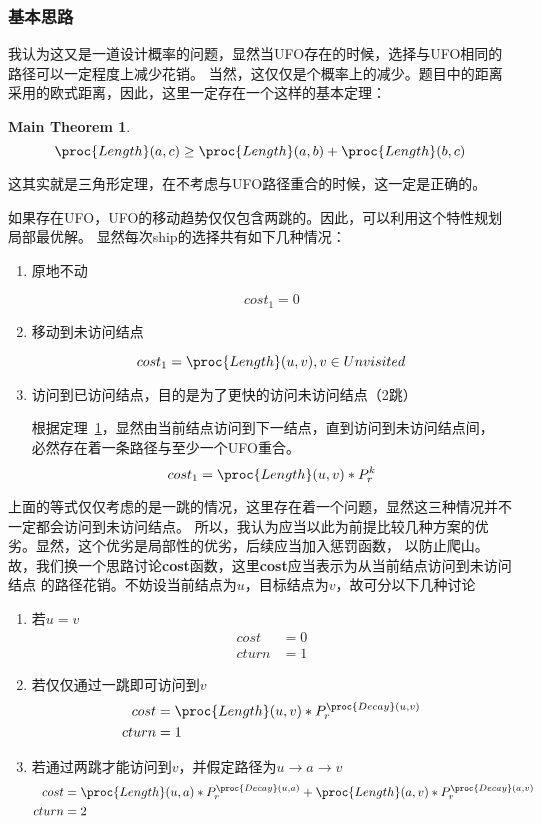 \documentclass[hyperref,UTF8]{ctexart}
\newtheorem{mthm}[thm]{Main Theorem}
\theoremstyle{definition}
\theoremstyle{remark}
\numberwithin{equation}{subsection}
\newcommand{\Emph}{\textbf}
\begin{document}
\subsubsection{基本思路}

	我认为这又是一道设计概率的问题，显然当UFO存在的时候，选择与UFO相同的路径可以一定程度上减少花销。
	当然，这仅仅是个概率上的减少。题目中的距离采用的欧式距离，因此，这里一定存在一个这样的基本定理：
	\begin{mthm}
	\label{mthm:triangle}
		\[
            \proc{Length}(a, c) \ge \proc{Length}(a, b) + \proc{Length}(b, c)
        \]
	\end{mthm}
	这其实就是三角形定理，在不考虑与UFO路径重合的时候，这一定是正确的。
	
	如果存在UFO，UFO的移动趋势仅仅包含两跳的。因此，可以利用这个特性规划局部最优解。
	显然每次ship的选择共有如下几种情况：
	\begin{enumerate}[(1)]
		
		\item 原地不动
		
		\[
			cost_1 = 0
		\]
		
		\item 移动到未访问结点
		
		\[
			cost_1 = \proc{Length}(u, v), v \in Unvisited
		\]
		
		\item 访问到已访问结点，目的是为了更快的访问未访问结点（2跳）
		
		根据定理~\ref{mthm:triangle}，显然由当前结点访问到下一结点，直到访问到未访问结点间，
		必然存在着一条路径与至少一个UFO重合。
		\[
			cost_1 = \proc{Length}(u, v) * P_r^k
		\]
	
	\end{enumerate}
	上面的等式仅仅考虑的是一跳的情况，这里存在着一个问题，显然这三种情况并不一定都会访问到未访问结点。
	所以，我认为应当以此为前提比较几种方案的优劣。显然，这个优劣是局部性的优劣，后续应当加入惩罚函数，
	以防止爬山。故，我们换一个思路讨论\Emph{cost}函数，这里\Emph{cost}应当表示为从当前结点访问到未访问结点
	的路径花销。不妨设当前结点为$u$，目标结点为$v$，故可分以下几种讨论
	\begin{enumerate}[(1)]
	
		\item 若$u = v$
		\begin{align*}
			cost	&=	0	\\
			cturn	&=	1
		\end{align*}
		
		\item 若仅仅通过一跳即可访问到$v$
		\begin{align*}
			cost	&= 	\proc{Length}(u, v) * P_r^{\proc{Decay}(u, v)}	\\
			cturn	&=	1
		\end{align*}
		
		\item 若通过两跳才能访问到$v$，并假定路径为$u \rightarrow a \rightarrow v$
		\begin{align*}
			cost	&=	\proc{Length}(u, a) * P_r^{\proc{Decay}(u, a)} + \proc{Length}(a, v) * P_r^{\proc{Decay}(a, v)}	\\
			cturn	&=	2
		\end{align*}
		
	\end{enumerate}
\end{document}
